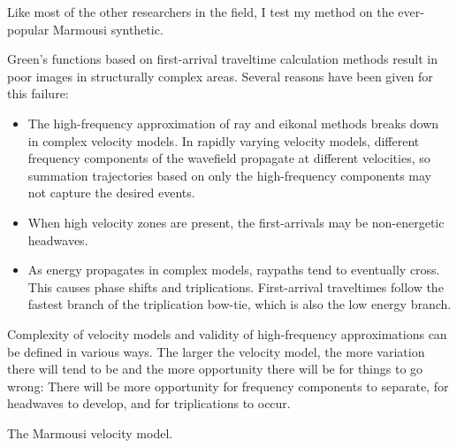 Like most of the other researchers in the field, I test my method on the
ever-popular Marmousi synthetic.


Green's functions based on 
first-arrival traveltime calculation methods result in poor images
in structurally complex areas. Several reasons have been given for this
failure:
\begin{itemize}
	\item The high-frequency approximation of ray and eikonal methods breaks
	down in complex velocity models. In rapidly varying velocity models,
	different frequency components of the
	wavefield propagate at different velocities, so summation trajectories
	based on only the high-frequency components may not capture
	the desired events.
	\item When high velocity zones are present, the first-arrivals
	may be non-energetic headwaves.
	\item As energy propagates in complex models, raypaths tend to
	eventually cross. This causes phase shifts and triplications.
	First-arrival traveltimes follow the fastest branch of the
	triplication bow-tie, which is also the low energy branch.
\end{itemize}

Complexity of velocity models and validity of high-frequency approximations
can be defined in various ways. The larger the velocity model, the 
more variation there will tend to be and the more opportunity there will be
for things to go wrong: There will be more opportunity for frequency
components to separate, for headwaves to develop, and for triplications
to occur. 

{The Marmousi velocity model.}

